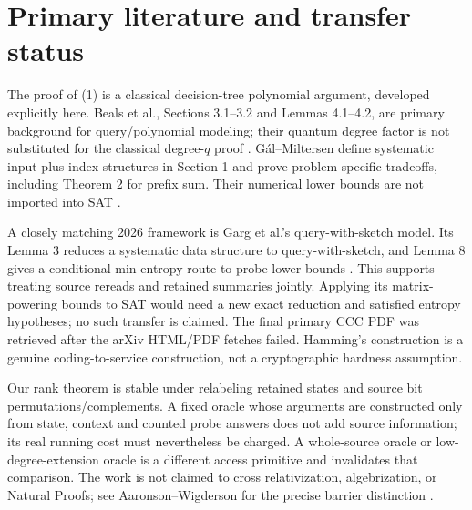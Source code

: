 \documentclass[11pt]{article}
\begin{document}
\section{Primary literature and transfer status}
The proof of (1) is a classical decision-tree polynomial argument, developed
explicitly here. Beals et al., Sections 3.1--3.2 and Lemmas 4.1--4.2, are
primary background for query/polynomial modeling; their quantum degree
factor is not substituted for the classical degree-$q$ proof
\cite{beals1998}. G\'al--Miltersen define systematic input-plus-index
structures in Section 1 and prove problem-specific tradeoffs, including
Theorem 2 for prefix sum. Their numerical lower bounds are not imported
into SAT \cite{gal2003}.

A closely matching 2026 framework is Garg et al.'s query-with-sketch model.
Its Lemma 3 reduces a systematic data structure to query-with-sketch, and
Lemma 8 gives a conditional min-entropy route to probe lower bounds
\cite{garg2026}. This supports treating source rereads and retained summaries
jointly. Applying its matrix-powering bounds to SAT would need a new exact
reduction and satisfied entropy hypotheses; no such transfer is claimed.
The final primary CCC PDF was retrieved after the arXiv HTML/PDF fetches
failed. Hamming's construction is a genuine coding-to-service construction,
not a cryptographic hardness assumption.

Our rank theorem is stable under relabeling retained states and source bit
permutations/complements. A fixed oracle whose arguments are constructed
only from state, context and counted probe answers does not add source
information; its real running cost must nevertheless be charged. A
whole-source oracle or low-degree-extension oracle is a different access
primitive and invalidates that comparison. The work is not claimed to
cross relativization, algebrization, or Natural Proofs; see
Aaronson--Wigderson for the precise barrier distinction \cite{aw2009}.
\end{document}

